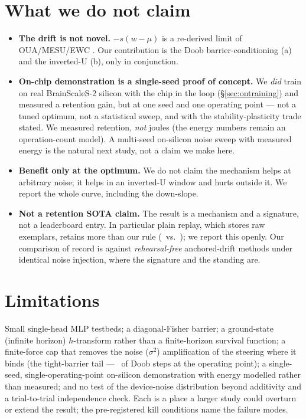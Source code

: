 \documentclass[11pt]{article}
\newcommand{\wmu}{(w-\mu)}
\begin{document}
\section{What we do not claim}

\begin{itemize}\itemsep2pt
\item \textbf{The drift is not novel.} $-s\wmu$ is a re-derived limit of
OUA/MESU/EWC \citep{oua2024,mesu2025,ewc2017}. Our contribution is the Doob
barrier-conditioning (a) and the inverted-U (b), only in conjunction.
\item \textbf{On-chip demonstration is a single-seed proof of concept.} We
\emph{did} train on real BrainScaleS-2 silicon with the chip in the loop
(\S\ref{sec:ontraining}) and measured a retention gain, but at one seed and one
operating point --- not a tuned optimum, not a statistical sweep, and with the
stability-plasticity trade stated. We measured retention, \emph{not} joules (the
energy numbers remain an operation-count model). A multi-seed on-silicon noise sweep
with measured energy is the natural next study, not a claim we make here.
\item \textbf{Benefit only at the optimum.} We do not claim the mechanism helps at
arbitrary noise; it helps in an inverted-U window and hurts outside it. We report
the whole curve, including the down-slope.
\item \textbf{Not a retention SOTA claim.} The result is a mechanism and a
signature, not a leaderboard entry. In particular plain replay, which stores raw
exemplars, retains more than our rule (\ReplayRetPct\ vs.\ \DoobStarRetPct); we
report this openly. Our comparison of record is against \emph{rehearsal-free}
anchored-drift methods under identical noise injection, where the signature and the
standing are.
\end{itemize}

\section{Limitations}
Small single-head MLP testbeds; a diagonal-Fisher barrier; a ground-state (infinite
horizon) $h$-transform rather than a finite-horizon survival function; a
finite-force cap that removes the noise ($\sigma^2$) amplification of the steering
where it binds (the tight-barrier tail --- \CapBindPct\ of Doob steps at the
operating point); a single-seed, single-operating-point
on-silicon demonstration with energy modelled rather than measured; and no test of
the device-noise distribution beyond additivity and a trial-to-trial independence
check. Each is a place a larger study could overturn or extend the result; the
pre-registered kill conditions name the failure modes.
\end{document}

